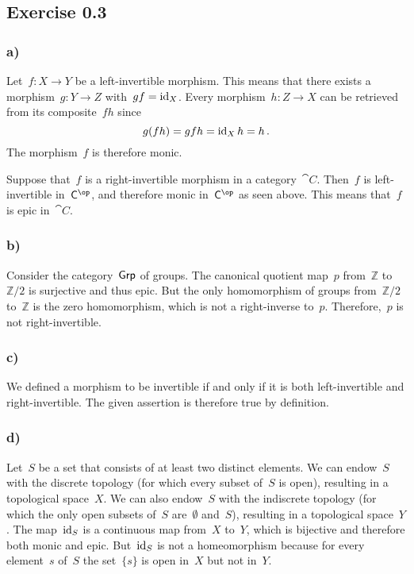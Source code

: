 \subsection{Exercise 0.3}



\subsubsection{a)}

Let~$f \colon X \to Y$ be a left-invertible morphism.
This means that there exists a morphism~$g \colon Y \to Z$ with~$g f = \operatorname{id}_X$.
Every morphism~$h \colon Z \to X$ can be retrieved from its composite~$f h$ since
\[
	g (f h) = g f h = \operatorname{id}_X h = h \,.
\]
The morphism~$f$ is therefore monic.

Suppose that~$f$ is a right-invertible morphism in a category~$\cat{C}$.
Then~$f$ is left-invertible in~$\cat{C}^{\op}$, and therefore monic in~$\cat{C}^{\op}$ as seen above.
This means that~$f$ is epic in~$\cat{C}$.



\subsubsection{b)}

Consider the category~$\mathsf{Grp}$ of groups.
The canonical quotient map~$p$ from~$ℤ$ to~$ℤ/2$ is surjective and thus epic.
But the only homomorphism of groups from~$ℤ/2$ to~$ℤ$ is the zero homomorphism, which is not a right-inverse to~$p$.
Therefore,~$p$ is not right-invertible.



\subsubsection{c)}

We defined a morphism to be invertible if and only if it is both left-invertible and right-invertible.
The given assertion is therefore true by definition.



\subsubsection{d)}

Let~$S$ be a set that consists of at least two distinct elements.
We can endow~$S$ with the discrete topology (for which every subset of~$S$ is open), resulting in a topological space~$X$.
We can also endow~$S$ with the indiscrete topology (for which the only open subsets of~$S$ are~$∅$ and~$S$), resulting in a topological space~$Y$.
The map~$\operatorname{id}_S$ is a continuous map from~$X$ to~$Y$, which is bijective and therefore both monic and epic.
But~$\operatorname{id}_S$ is not a homeomorphism because for every element~$s$ of~$S$ the set~$\{ s \}$ is open in~$X$ but not in~$Y$.



